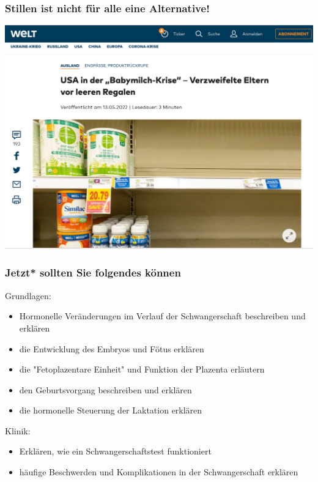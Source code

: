 \documentclass{beamer}
\begin{document}
\begin{frame}
\frametitle{Stillen ist nicht für alle eine Alternative!}

\includegraphics[width=\textwidth]{babymilchkrise.png}

\end{frame}



\begin{frame}

 \frametitle{Jetzt* sollten Sie folgendes können}



\begin{block}{Grundlagen:}
\begin{itemize}
\item
Hormonelle Veränderungen im Verlauf der Schwangerschaft beschreiben und erklären
\item
die Entwicklung des Embryos und Fötus erklären 
\item
die "Fetoplazentare Einheit" und Funktion der Plazenta erläutern
\item
den Geburtsvorgang beschreiben und erklären
\item
die hormonelle Steuerung der Laktation erklären

\end{itemize}

\end{block}



\begin{block}{Klinik:}
\begin{itemize}
\item
Erklären, wie ein Schwangerschaftstest funktioniert
\item
häufige Beschwerden und Komplikationen in der Schwangerschaft erklären

\end{itemize}

\end{block}

\end{frame}
\end{document}

